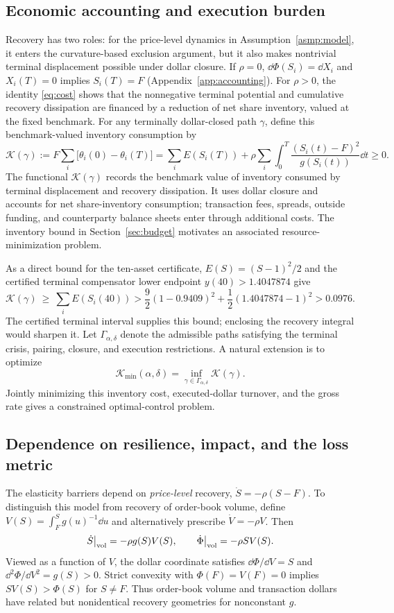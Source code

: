 \documentclass[review,hidelinks,onefignum,onetabnum]{siamonline250211}
\begin{document}
\subsection{Economic accounting and execution burden}
Recovery has two roles: for the price-level dynamics in Assumption~\ref{asmp:model}, it enters the curvature-based exclusion argument, but it also makes nontrivial terminal displacement possible under dollar closure. If $\rho=0$, $\dd\Phi(S_i)=\dd X_i$ and $X_i(T)=0$ implies $S_i(T)=F$ (Appendix~\ref{app:accounting}). For $\rho>0$, the identity \eqref{eq:cost} shows that the nonnegative terminal potential and cumulative recovery dissipation are financed by a reduction of net share inventory, valued at the fixed benchmark. For any terminally dollar-closed path $\gamma$, define this benchmark-valued inventory consumption by
\[
\mathcal K(\gamma):=
F\sum_i\bigl[\theta_i(0)-\theta_i(T)\bigr]
=\sum_i E(S_i(T))+
\rho\sum_i\int_0^T\frac{(S_i(t)-F)^2}{g(S_i(t))}\dd t\ge0.
\]
The functional $\mathcal K(\gamma)$ records the benchmark value of inventory consumed by terminal displacement and recovery dissipation. It uses dollar closure and accounts for net share-inventory consumption; transaction fees, spreads, outside funding, and counterparty balance sheets enter through additional costs. The inventory bound in Section~\ref{sec:budget} motivates an associated resource-minimization problem.

As a direct bound for the ten-asset certificate, $E(S)=(S-1)^2/2$ and the certified terminal compensator lower endpoint $y(40)>1.4047874$ give
\[
\mathcal K(\gamma)\ \ge\ \sum_i E(S_i(40))
>\frac92(1-0.9409)^2+\frac12(1.4047874-1)^2>0.0976.
\]
The certified terminal interval supplies this bound; enclosing the recovery integral would sharpen it. Let $\Gamma_{\alpha,\delta}$ denote the admissible paths satisfying the terminal crisis, pairing, closure, and execution restrictions. A natural extension is to optimize
\[
\mathcal K_{\min}(\alpha,\delta)
=\inf_{\gamma\in\Gamma_{\alpha,\delta}}\mathcal K(\gamma).
\]
Jointly minimizing this inventory cost, executed-dollar turnover, and the gross rate gives a constrained optimal-control problem.

\subsection{Dependence on resilience, impact, and the loss metric}
\label{subsec:resilience-metric}
The elasticity barriers depend on \emph{price-level} recovery,
$\dot S=-\rho(S-F)$. To distinguish this model from
recovery of order-book volume, define
$V(S)=\int_F^S g(u)^{-1}\dd u$ and alternatively
prescribe $\dot V=-\rho V$. Then
\[
\dot S\big|_{\rm vol}=-\rho g(S)V(S),\qquad
\dot\Phi\big|_{\rm vol}=-\rho S V(S).
\]
Viewed as a function of $V$, the dollar coordinate
satisfies $\dd\Phi/\dd V=S$ and
$\dd^2\Phi/\dd V^2=g(S)>0$.
Strict convexity with $\Phi(F)=V(F)=0$ implies
$S V(S)>\Phi(S)$ for $S\ne F$.
Thus order-book volume and transaction dollars
have related but nonidentical recovery geometries
for nonconstant $g$.
\end{document}
